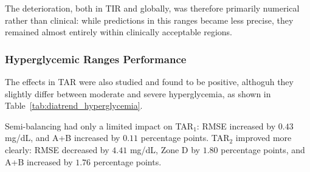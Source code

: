 The deterioration, both in TIR and globally, was therefore primarily numerical rather than
clinical: while predictions in this ranges became less precise, they remained almost entirely
within clinically acceptable regions.

\subsubsection{Hyperglycemic Ranges Performance}
\label{subsubsec:diatrend_hyperglycemia}

The effects in TAR were also studied and found to be positive, althoguh they slightly differ between moderate and severe hyperglycemia, as shown in Table~\ref{tab:diatrend_hyperglycemia}.

\begin{table}[htbp]
    \centering
    \caption{Aggregate DiaTrend performance in the hyperglycemic ranges,
    averaged across balancing methods.}
    \label{tab:diatrend_hyperglycemia}
\end{table}

Semi-balancing had only a limited impact on TAR$_1$: RMSE increased by \(0.43\) mg/dL, and A+B increased by \(0.11\) percentage points. TAR$_2$ improved more clearly: RMSE
decreased by \(4.41\) mg/dL, Zone D by \(1.80\) percentage points, and A+B increased by \(1.76\) percentage points.

